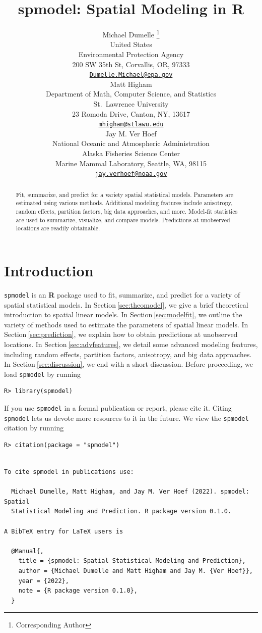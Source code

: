 \documentclass{article}
\title{spmodel: Spatial Modeling in \textbf{R}}
\author{
    Michael Dumelle
    \thanks{Corresponding Author}
   \\
    United States \\
    Environmental Protection Agency \\
  200 SW 35th St, Corvallis, OR, 97333 \\
  \texttt{\href{mailto:Dumelle.Michael@epa.gov}{\nolinkurl{Dumelle.Michael@epa.gov}}} \\
   \And
    Matt Higham
   \\
    Department of Math, Computer Science, and Statistics \\
    St.~Lawrence University \\
  23 Romoda Drive, Canton, NY, 13617 \\
  \texttt{\href{mailto:mhigham@stlawu.edu}{\nolinkurl{mhigham@stlawu.edu}}} \\
   \And
    Jay M. Ver Hoef
   \\
    National Oceanic and Atmospheric Administration \\
    Alaska Fisheries Science Center \\
  Marine Mammal Laboratory, Seattle, WA, 98115 \\
  \texttt{\href{mailto:jay.verhoef@noaa.gov}{\nolinkurl{jay.verhoef@noaa.gov}}} \\
  }
\begin{document}
\maketitle


\begin{abstract}
Fit, summarize, and predict for a variety spatial statistical models.
Parameters are estimated using various methods. Additional modeling
features include anisotropy, random effects, partition factors, big data
approaches, and more. Model-fit statistics are used to summarize,
visualize, and compare models. Predictions at unobserved locations are
readily obtainable.
\end{abstract}


\hypertarget{sec:introduction}{%
\section{Introduction}\label{sec:introduction}}

\texttt{spmodel} is an \textbf{\textsf{R}} package used to fit,
summarize, and predict for a variety of spatial statistical models. In
Section\(~\)\ref{sec:theomodel}, we give a brief theoretical
introduction to spatial linear models. In
Section\(~\)\ref{sec:modelfit}, we outline the variety of methods used
to estimate the parameters of spatial linear models. In
Section\(~\)\ref{sec:prediction}, we explain how to obtain predictions
at unobserved locations. In Section\(~\)\ref{sec:advfeatures}, we detail
some advanced modeling features, including random effects, partition
factors, anisotropy, and big data approaches. In
Section\(~\)\ref{sec:discussion}, we end with a short discussion. Before
proceeding, we load \texttt{spmodel} by running

\begin{verbatim}
R> library(spmodel)
\end{verbatim}

If you use \texttt{spmodel} in a formal publication or report, please
cite it. Citing \texttt{spmodel} lets us devote more resources to it in
the future. We view the \texttt{spmodel} citation by running

\begin{verbatim}
R> citation(package = "spmodel")
\end{verbatim}

\begin{verbatim}

To cite spmodel in publications use:

  Michael Dumelle, Matt Higham, and Jay M. Ver Hoef (2022). spmodel: Spatial
  Statistical Modeling and Prediction. R package version 0.1.0.

A BibTeX entry for LaTeX users is

  @Manual{,
    title = {spmodel: Spatial Statistical Modeling and Prediction},
    author = {Michael Dumelle and Matt Higham and Jay M. {Ver Hoef}},
    year = {2022},
    note = {R package version 0.1.0},
  }
\end{verbatim}
\end{document}
